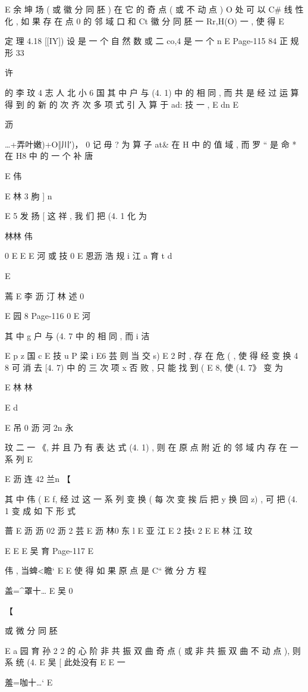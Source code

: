 {{E 余
坤 场 ( 或 徽 分 同 胚 ) 在 它 的 奇 点 ( 或 不 动 点 ) O 处 可 以 C# 线 性 化 , 如
果 存 在 点 0 的 邻 域 口 和 Ct 徽 分 同 胚 一 Rr,H(O) 一 , 使 得
E

定 理 4.18 [[IY]) 设 是 一 个 自 然 数 或 二 co,4 是 一 个 n
E
Page-115
84 正 规 形 33

许

的 李 玟 4 志 人 北 小 6 国
其 中 户 与 (4. 1) 中 的 相 同 , 而 共 是 经 过 运 算 得 到 的 新 的 次 齐 次
多 项 式
引 入 算 于 ad: 技 一 ,
E dn
E

沥

…+弄叶嫩)+O‖川′)， 0
记 毋 ? 为 算 子 at& 在 H 中 的 值 域 , 而 罗 “ 是 命 * 在 H8 中 的 一 个 补
唐

E 伟

E 林 3 朐 ]
n

E 5 发 扬 [
这 祥 , 我 们 把 (4. 1 化 为

林林 伟

0
E
E
E 河 或 技 0
E 恩沥 浩 规 i 江 a 育 t d

E

蔫 E 李 沥 汀 林 述 0

E 园 8
Page-116
0 E 河

其 中 g 户 与 (4. 7 中 的 相 同 , 而 i
洁

E p z 国 c
E 技 u P 梁 i
E6 芸
则 当 交 s) E 2 时 , 存 在 危 ( , 使 得 经 变 换 4 8 可 消 去 [4. 7) 中
的 三 次 项 x 否 败 , 只 能 找 到 ( E 8, 使 (4. 7》 变 为

E 林 林

E d

E 吊 0 沥 河 2n 永

玟 二
一 《, 并 且 乃 有 表 达 式 (4. 1) , 则 在 原 点 附 近 的 邻 域 内 存 在 一 系 列
E

E 沥 连 42 兰n 【

其 中 伟 ( E f, 经 过 这 一 系 列 变 换 ( 每 次 变 挨 后 把 y 换 回 z) , 可
把 (4. 1 变 成 如 下 形 式

蔷 E 沥 沥 02 沥 2 芸
E 沥 林0 东 l
E 亚 江
E 2 技t 2
E
E 林 江
玟

E E
E 吴 育
Page-117
E

伟 , 当蜱<瞻`
E E
使 得 如 果 原 点 是 C“ 微 分 方 程

盖=^罩十… E 吴 0

【

或 微 分 同 胚

E a 园 育 孙 2 2
的 心 阶 非 共 振 双 曲 奇 点 ( 或 非 共 振 双 曲 不 动 点 ), 则 系 统 (4.
E 吴
[ 此处没有
E
E 一

羞=咖十…` E

}}
